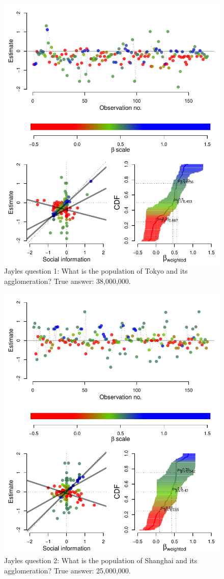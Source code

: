 \documentclass[9pt,twoside,lineno]{pnas-new}
\begin{document}
\begin{figure}[htbp]
	\centering\includegraphics[width=.5\textwidth]{../plots/jayles1.pdf}
	\caption{Jayles question 1: What is the population of Tokyo and its agglomeration? True answer: 38,000,000.}\label{fig: Jayles question 1}
\end{figure}



\begin{figure}[htbp]
	\centering\includegraphics[width=.5\textwidth]{../plots/jayles2.pdf}
	\caption{Jayles question 2: What is the population of Shanghai and its agglomeration? True answer: 25,000,000.}\label{fig: Jayles question 2}
\end{figure}
\end{document}
